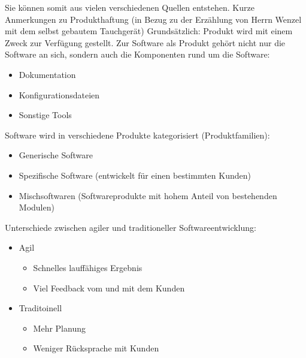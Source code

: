 \documentclass[a4paper,12pt,twoside]{scrreprt}
\begin{document}
Sie können somit aus vielen verschiedenen Quellen entstehen.
Kurze Anmerkungen zu Produkthaftung (in Bezug zu der Erzählung von Herrn Wenzel mit dem selbst gebautem Tauchgerät) \newline
Grundsätzlich: Produkt wird mit einem Zweck zur Verfügung gestellt.
\newline
Zur Software als Produkt gehört nicht nur die Software an sich, sondern auch die Komponenten rund um die Software:
\begin{itemize}
\item{Dokumentation}
\item{Konfigurationsdateien}
\item{Sonstige Tools}
\end{itemize}

Software wird in verschiedene Produkte kategorisiert (Produktfamilien):
\begin{itemize}
  \item{Generische Software}
  \item{Spezifische Software (entwickelt für einen bestimmten Kunden)}
  \item{Mischsoftwaren (Softwareprodukte mit hohem Anteil von bestehenden Modulen)}
\end{itemize}

Unterschiede zwischen agiler und traditioneller Softwareentwicklung:
\begin{itemize}
  \item{Agil}
    \begin{itemize}
    \item{Schnelles lauffähiges Ergebnis}
    \item{Viel Feedback vom und mit dem Kunden}
    \end{itemize}
  \item{Traditoinell}
    \begin{itemize}
      \item{Mehr Planung}
      \item{Weniger Rücksprache mit Kunden}
    \end{itemize}
\end{itemize}
\end{document}
